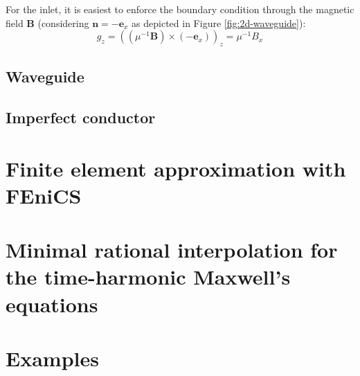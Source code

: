 \documentclass[11pt, a4paper]{article}
\begin{document}
For the inlet, it is easiest to enforce the boundary condition through the
magnetic field $\mathbf{B}$ (considering $\mathbf{n} = -\mathbf{e}_x$ as
depicted in Figure \ref{fig:2d-waveguide}):
\begin{equation}
    g_z = (({\mu^{-1} \mathbf{B}}) \times (-\mathbf{e}_x))_z = \mu^{-1} B_x
\end{equation}



\subsection{Waveguide}
\label{subsec:waveguide}


\subsection{Imperfect conductor}
\label{subsec:impedance}



\pagebreak
\section{Finite element approximation with FEniCS}
\label{sec:fem}



%

\pagebreak
\section{Minimal rational interpolation for the time-harmonic Maxwell's equations}
\label{sec:mri}









\pagebreak
\section{Examples}
\label{sec:examples}
\end{document}
